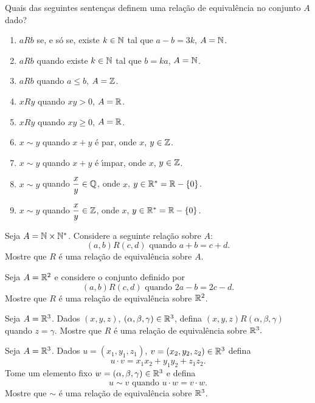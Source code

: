 \documentclass[12pt]{exam}
\begin{document}
\questao{} Quais das seguintes senten{\c c}as definem uma rela{\c c}{\~a}o de equival{\^e}ncia no conjunto $A$ dado?
\begin{enumerate}[label={\alph*})]
    \item $aRb$ se, e s{\'o} se, existe $k \in \mathbb{N}$ tal que $a - b = 3k$, $A = \mathbb{N}$.
    \item $aRb$ quando existe $k \in \mathbb{N}$ tal que $b = k a$, $A = \mathbb{N}$.
    \item $aRb$ quando $a \le b$, $A = \mathbb{Z}$.
    \item $xRy$ quando $xy > 0$, $ A = \mathbb{R}$.
    \item $xRy$ quando $xy \ge 0$, $ A = \mathbb{R}$.
    \item $x \sim y$ quando $x + y$ \'e par, onde $x$, $y \in \mathbb{Z}$.
    \item $x \sim y$ quando $x + y$ \'e {\'\i}mpar, onde $x$, $y \in \mathbb{Z}$.
    \item $x \sim y$ quando $\dfrac{x}{y} \in \mathbb{Q}$, onde $x$, $y \in \mathbb{R}^* = \mathbb{R} - \{0\}$.
    \item $x \sim y$ quando $\dfrac{x}{y} \in \mathbb{Z}$, onde $x$, $y \in \mathbb{R}^* = \mathbb{R} - \{0\}$.
\end{enumerate}

\vspace{.3cm}


\questao{} Seja $A = \mathbb{N} \times \mathbb{N}^*$. Considere a seguinte
rela{\c c}{\~a}o sobre $A$:
\[
    (a,b) R (c,d) \mbox{ quando } a + b = c + d.
\]
Mostre que $R$ {\'e} uma rela{\c c}{\~a}o de equival{\^e}ncia sobre $A$.

\vspace{.3cm}

\questao{} Seja $A = \mathbb{R}^2$ e considere o conjunto definido por
\[
  (a,b)R(c,d) \mbox{ quando } 2a - b = 2c - d.
\]
Mostre que $R$ \'e uma rela\c{c}\~ao de equival\^encia sobre $\mathbb{R}^2$.

\vspace{.3cm}

\questao{} Seja $A = \mathbb{R}^3$. Dados $(x, y, z)$, $(\alpha, \beta, \gamma) \in \mathbb{R}^3$, defina $(x, y, z) R (\alpha, \beta, \gamma)$ quando $z = \gamma$. Mostre que $R$ \'e uma rela\c{c}\~ao de equival\^encia sobre $\mathbb{R}^3.$

\vspace{.3cm}

\questao{} Seja $A = \mathbb{R}^3$. Dados $u = (x_1, y_1, z_1)$, $v = (x_2, y_2, z_2) \in \mathbb{R}^3$ defina
\[
    u\cdot v = x_1x_2 + y_1y_2 + z_1z_2.
\]
Tome um elemento fixo $w = (\alpha, \beta, \gamma) \in \mathbb{R}^3$ e defina
\[
    u \sim v \mbox{ quando } u \cdot w = v \cdot w.
\]
Mostre que $\sim$ \'e uma rela\c{c}\~ao de equival\^encia sobre $\mathbb{R}^3$.
\end{document}
